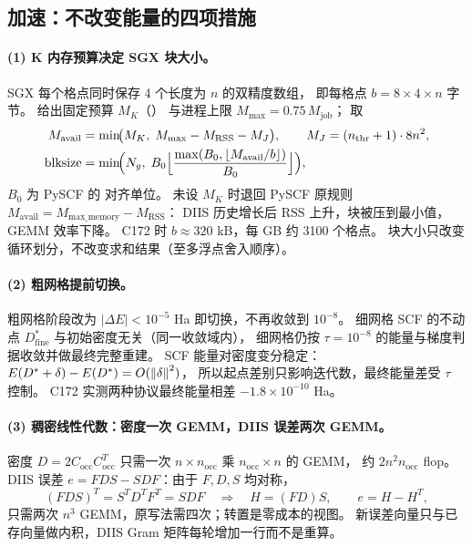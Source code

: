 \subsection{加速：不改变能量的四项措施}
\label{sec:repair-speed}
\paragraph{(1) K 内存预算决定 SGX 块大小。}
SGX 每个格点同时保存 4 个长度为 \(n\) 的双精度数组，
即每格点 \(b=8\times4\times n\) 字节。
 给出固定预算 \(M_K\)（）
与进程上限 \(M_{\max}=0.75\,M_{\mathrm{job}}\)；
 取
\begin{align}
M_{\mathrm{avail}}&=\min\!\bigl(M_K,\;M_{\max}-M_{\mathrm{RSS}}-M_J\bigr),
\qquad M_J=(n_{\mathrm{thr}}+1)\cdot8n^2,\\
\mathrm{blksize}&=\min\!\Bigl(N_g,\;
B_0\Bigl\lfloor\frac{\max(B_0,\lfloor M_{\mathrm{avail}}/b\rfloor)}{B_0}\Bigr\rfloor\Bigr),
\end{align}
\(B_0\) 为 PySCF 的  对齐单位。
未设 \(M_K\) 时退回 PySCF 原规则 \(M_{\mathrm{avail}}=M_{\mathrm{max\_memory}}-M_{\mathrm{RSS}}\)：
DIIS 历史增长后 RSS 上升，块被压到最小值，GEMM 效率下降。
C172 时 \(b\approx320\) kB，每 GB 约 3100 个格点。
块大小只改变循环划分，不改变求和结果（至多浮点舍入顺序）。

\paragraph{(2) 粗网格提前切换。}
粗网格阶段改为 \(|\Delta E|<10^{-5}\) Ha 即切换，不再收敛到 \(10^{-8}\)。
细网格 SCF 的不动点 \(D^\ast_{\mathrm{fine}}\) 与初始密度无关（同一收敛域内），
细网格仍按 \(\tau=10^{-8}\) 的能量与梯度判据收敛并做最终完整重建。
SCF 能量对密度变分稳定：
\(E(D^\ast+\delta)-E(D^\ast)=O(\left\lVert \delta\right\rVert^2)\)，
所以起点差别只影响迭代数，最终能量差受 \(\tau\) 控制。
C172 实测两种协议最终能量相差 \(-1.8\times10^{-10}\) Ha。

\paragraph{(3) 稠密线性代数：密度一次 GEMM，DIIS 误差两次 GEMM。}
密度 \(D=2C_{\mathrm{occ}}C_{\mathrm{occ}}^T\) 只需一次
\(n\times n_{\mathrm{occ}}\) 乘 \(n_{\mathrm{occ}}\times n\) 的 GEMM，
约 \(2n^2n_{\mathrm{occ}}\) flop。
DIIS 误差 \(e=FDS-SDF\)：由于 \(F,D,S\) 均对称，
\begin{equation}
(FDS)^T=S^TD^TF^T=SDF
\quad\Longrightarrow\quad
H=(FD)S,\qquad e=H-H^T,
\end{equation}
只需两次 \(n^3\) GEMM，原写法需四次；转置是零成本的视图。
新误差向量只与已存向量做内积，DIIS Gram 矩阵每轮增加一行而不是重算。

